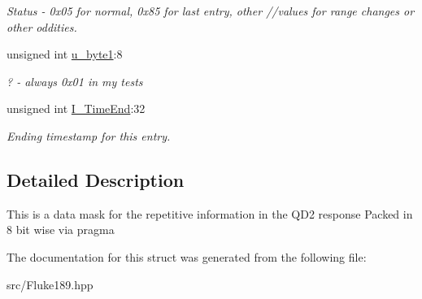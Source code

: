 \begin{DoxyCompactItemize}
\begin{DoxyCompactList}\small\item\em Status -\/ 0x05 for normal, 0x85 for last entry, other //values for range changes or other oddities. \item\end{DoxyCompactList}\item 
\hypertarget{structFluke_1_1Fluke189_1_1qd2__set__t_aec78e59ad38fbd0916f0632ed1c1bf4b}{
unsigned int \hyperlink{structFluke_1_1Fluke189_1_1qd2__set__t_aec78e59ad38fbd0916f0632ed1c1bf4b}{u\_\-byte1}:8}
\label{structFluke_1_1Fluke189_1_1qd2__set__t_aec78e59ad38fbd0916f0632ed1c1bf4b}

\begin{DoxyCompactList}\small\item\em ? -\/ always 0x01 in my tests \item\end{DoxyCompactList}\item 
\hypertarget{structFluke_1_1Fluke189_1_1qd2__set__t_a57828e561ec4f5c8690868f9e74cab8c}{
unsigned int \hyperlink{structFluke_1_1Fluke189_1_1qd2__set__t_a57828e561ec4f5c8690868f9e74cab8c}{I\_\-TimeEnd}:32}
\label{structFluke_1_1Fluke189_1_1qd2__set__t_a57828e561ec4f5c8690868f9e74cab8c}

\begin{DoxyCompactList}\small\item\em Ending timestamp for this entry. \item\end{DoxyCompactList}\end{DoxyCompactItemize}


\subsection{Detailed Description}
This is a data mask for the repetitive information in the QD2 response Packed in 8 bit wise via pragma\par
 

The documentation for this struct was generated from the following file:\begin{DoxyCompactItemize}
\item 
src/Fluke189.hpp\end{DoxyCompactItemize}
